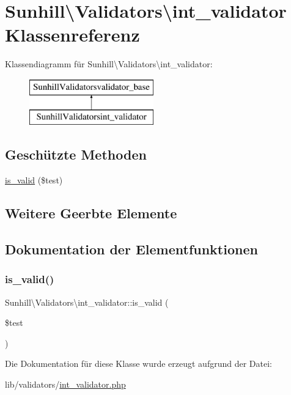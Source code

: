 \hypertarget{classSunhill_1_1Validators_1_1int__validator}{}\section{Sunhill\textbackslash{}Validators\textbackslash{}int\+\_\+validator Klassenreferenz}
\label{classSunhill_1_1Validators_1_1int__validator}
Klassendiagramm für Sunhill\textbackslash{}Validators\textbackslash{}int\+\_\+validator\+:\begin{figure}[H]
\begin{center}
\leavevmode
\includegraphics[height=2.000000cm]{d6/dea/classSunhill_1_1Validators_1_1int__validator}
\end{center}
\end{figure}
\subsection*{Geschützte Methoden}
\begin{DoxyCompactItemize}
\item 
\hyperlink{classSunhill_1_1Validators_1_1int__validator_abc5661a7c3d7d994fa66315a7c0e1044}{is\+\_\+valid} (\$test)
\end{DoxyCompactItemize}
\subsection*{Weitere Geerbte Elemente}


\subsection{Dokumentation der Elementfunktionen}
\mbox{\label{classSunhill_1_1Validators_1_1int__validator_abc5661a7c3d7d994fa66315a7c0e1044}} 
\subsubsection{\texorpdfstring{is\+\_\+valid()}{is\_valid()}}
{\footnotesize\ttfamily Sunhill\textbackslash{}\+Validators\textbackslash{}int\+\_\+validator\+::is\+\_\+valid (\begin{DoxyParamCaption}\item[{}]{\$test }\end{DoxyParamCaption})\hspace{0.3cm}{\ttfamily [protected]}}



Die Dokumentation für diese Klasse wurde erzeugt aufgrund der Datei\+:\begin{DoxyCompactItemize}
\item 
lib/validators/\hyperlink{int__validator_8php}{int\+\_\+validator.\+php}\end{DoxyCompactItemize}
